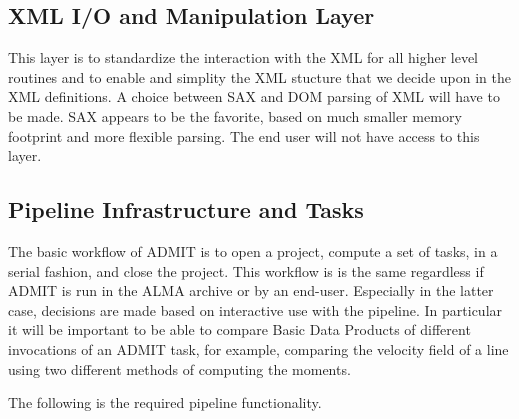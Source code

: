 \documentclass{article}
\begin{document}
\subsection{XML I/O and Manipulation Layer}

This layer is to standardize the interaction with the XML for all higher
level routines and to enable and simplity the XML stucture that we decide
upon in the XML definitions. A choice between SAX and DOM parsing of XML
will have to be made.  SAX appears to be the favorite, based on much
smaller memory footprint and more flexible parsing.  The end user will
not have access to this layer.

\subsection{Pipeline Infrastructure and Tasks}

The basic workflow of ADMIT is to open a project, compute a set of tasks,
in a serial fashion, and close the project. This workflow is is the
same regardless if ADMIT is run in the ALMA archive or by an end-user.
Especially in the latter case, decisions are made based on interactive
use with the pipeline. In particular it will be important to be able to
compare Basic Data Products of different invocations of an ADMIT task,
for example, comparing the velocity field of a line using two
different methods of computing the moments.  

The following is the required pipeline functionality.
\end{document}
